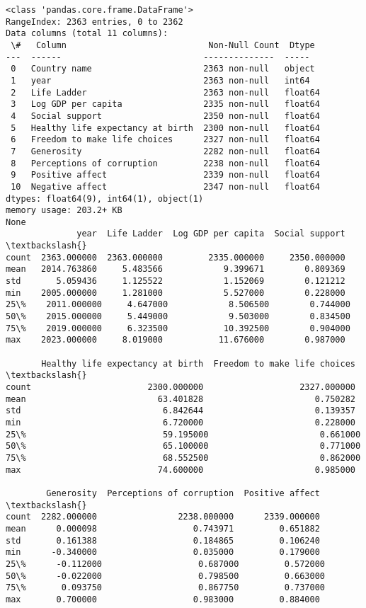 \documentclass[11pt]{article}
\begin{document}
    \begin{Verbatim}[commandchars=\\\{\}]
<class 'pandas.core.frame.DataFrame'>
RangeIndex: 2363 entries, 0 to 2362
Data columns (total 11 columns):
 \#   Column                            Non-Null Count  Dtype
---  ------                            --------------  -----
 0   Country name                      2363 non-null   object
 1   year                              2363 non-null   int64
 2   Life Ladder                       2363 non-null   float64
 3   Log GDP per capita                2335 non-null   float64
 4   Social support                    2350 non-null   float64
 5   Healthy life expectancy at birth  2300 non-null   float64
 6   Freedom to make life choices      2327 non-null   float64
 7   Generosity                        2282 non-null   float64
 8   Perceptions of corruption         2238 non-null   float64
 9   Positive affect                   2339 non-null   float64
 10  Negative affect                   2347 non-null   float64
dtypes: float64(9), int64(1), object(1)
memory usage: 203.2+ KB
None
              year  Life Ladder  Log GDP per capita  Social support  \textbackslash{}
count  2363.000000  2363.000000         2335.000000     2350.000000
mean   2014.763860     5.483566            9.399671        0.809369
std       5.059436     1.125522            1.152069        0.121212
min    2005.000000     1.281000            5.527000        0.228000
25\%    2011.000000     4.647000            8.506500        0.744000
50\%    2015.000000     5.449000            9.503000        0.834500
75\%    2019.000000     6.323500           10.392500        0.904000
max    2023.000000     8.019000           11.676000        0.987000

       Healthy life expectancy at birth  Freedom to make life choices  \textbackslash{}
count                       2300.000000                   2327.000000
mean                          63.401828                      0.750282
std                            6.842644                      0.139357
min                            6.720000                      0.228000
25\%                           59.195000                      0.661000
50\%                           65.100000                      0.771000
75\%                           68.552500                      0.862000
max                           74.600000                      0.985000

        Generosity  Perceptions of corruption  Positive affect  \textbackslash{}
count  2282.000000                2238.000000      2339.000000
mean      0.000098                   0.743971         0.651882
std       0.161388                   0.184865         0.106240
min      -0.340000                   0.035000         0.179000
25\%      -0.112000                   0.687000         0.572000
50\%      -0.022000                   0.798500         0.663000
75\%       0.093750                   0.867750         0.737000
max       0.700000                   0.983000         0.884000


\end{Verbatim}
\end{document}
